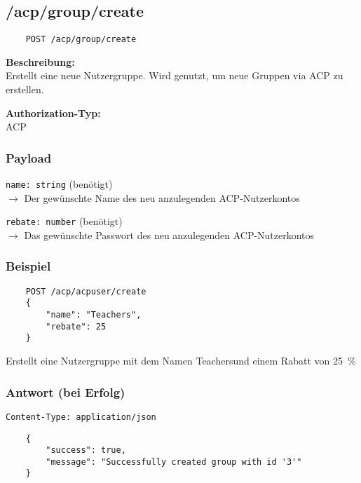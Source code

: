 \subsection{/acp/group/create}

\begin{lstlisting}
    POST /acp/group/create
\end{lstlisting}

\textbf{Beschreibung:} \\
Erstellt eine neue Nutzergruppe. Wird genutzt, um neue Gruppen via ACP zu erstellen.

\textbf{Authorization-Typ:} \\
ACP

\subsubsection{Payload}

\lstinline{name: string} (benötigt) \\
$\rightarrow$ Der gewünschte Name des neu anzulegenden ACP-Nutzerkontos

\lstinline{rebate: number} (benötigt) \\
$\rightarrow$ Das gewünschte Passwort des neu anzulegenden ACP-Nutzerkontos

\subsubsection{Beispiel}

\begin{lstlisting}
    POST /acp/acpuser/create
    {
        "name": "Teachers",
        "rebate": 25
    }
\end{lstlisting}

Erstellt eine Nutzergruppe mit dem Namen \glqq Teachers\grqq und einem Rabatt von \SI{25}{\percent}

\subsubsection{Antwort (bei Erfolg)}

\lstinline{Content-Type: application/json}
\begin{lstlisting}
    {
        "success": true, 
        "message": "Successfully created group with id '3'"
    }
\end{lstlisting}
